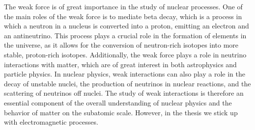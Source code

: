


The weak force is of great importance in the study of nuclear processes. One of the main roles of the weak force is to mediate  beta decay,
which is a process in which a neutron in a nucleus is converted into a proton, emitting an electron and an antineutrino. This process plays
a crucial role in the formation of elements in the universe, as it allows for the conversion of neutron-rich isotopes into more stable,
proton-rich isotopes. Additionally, the weak force plays a role in neutrino interactions with matter, which are of great interest in both
astrophysics and particle physics. In nuclear physics, weak interactions can also play a role in the decay of unstable nuclei, the
production of neutrinos in nuclear reactions, and the scattering of neutrinos off nuclei. The study of weak interactions is therefore an
essential component of the overall understanding of nuclear physics and the behavior of matter on the subatomic scale.
However, in the thesis we stick up with electromagnetic processes.



